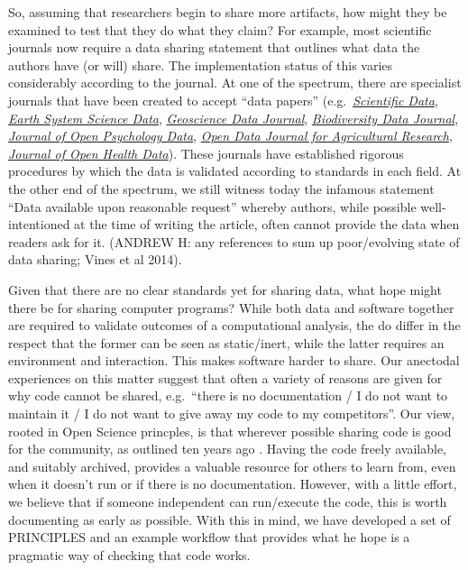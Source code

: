 \documentclass[12pt]{article}
\begin{document}
So, assuming that researchers begin to share more artifacts, how might
they be examined to test that they do what they claim? For example,
most scientific journals now require a data sharing statement that
outlines what data the authors have (or will) share.
The implementation status of this varies considerably according to the
journal. At one of the spectrum, there are specialist journals that
have been created to accept ``data papers'' (e.g.~\href{}{\emph{Scientific
  Data}}, 
\href{https://essd.copernicus.org/}{\emph{Earth System Science Data}}, 
\href{https://rmets.onlinelibrary.wiley.com/journal/20496060}{\emph{Geoscience Data Journal}},
\href{https://bdj.pensoft.net/}{\emph{Biodiversity Data Journal}},
\href{https://openpsychologydata.metajnl.com/}{\emph{Journal of Open Psychology Data}},
\href{https://odjar.org/}{\emph{Open Data Journal for Agricultural Research}},
\href{https://openhealthdata.metajnl.com}{\emph{Journal of Open Health Data}}).
These journals have established rigorous procedures by which
the data is validated according to standards in each field. At the
other end of the spectrum, we still witness today the infamous
statement ``Data available upon reasonable request'' whereby authors,
while possible well-intentioned at the time of writing the article,
often cannot provide the data when readers ask for
it.  (ANDREW H: any references to sum up poor/evolving state of data
sharing; Vines et al 2014).

Given that there are no clear standards yet for sharing data, what hope
might there be for sharing computer programs? While both data and software
together are required to validate outcomes of a computational analysis,
the do differ in the respect that the former can be seen as static/inert,
while the latter requires an environment and interaction. This makes 
software harder to share.
Our anectodal experiences
on this matter suggest that often a variety of reasons are given for why
code cannot be shared, e.g.~``there is no documentation / I do not
want to maintain it / I do not want to give away my code to my
competitors''. Our view, rooted in Open Science princples, is that
wherever possible sharing code is good for the community, as outlined
ten years ago \cite{Barnes2010-iv}. Having the code freely available, and
suitably archived, provides a valuable resource for others to learn
from, even when it doesn't run or if there is no documentation. However,
with a little effort, we believe that if someone independent can run/execute
the code, this is worth documenting as early as possible. With this in
mind, we have developed a set of PRINCIPLES and an example workflow that
provides what he hope is a pragmatic way of checking that code works.
\end{document}
